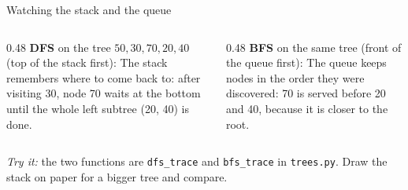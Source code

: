 \documentclass[aspectratio=169,10pt]{beamer}
\begin{document}
\begin{frame}{Watching the stack and the queue}
\begin{columns}[T]
\begin{column}{0.48\textwidth}
{\small \textbf{DFS} on the tree $50,30,70,20,40$ (top of the stack first):}
\vspace{2mm}
{\small The stack remembers where to come back to: after visiting 30, node 70 waits at the bottom until the whole left subtree (20, 40) is done.}
\end{column}
\begin{column}{0.48\textwidth}
{\small \textbf{BFS} on the same tree (front of the queue first):}
\vspace{2mm}
{\small The queue keeps nodes in the order they were discovered: 70 is served before 20 and 40, because it is closer to the root.}
\end{column}
\end{columns}
\vspace{2mm}
{\small \emph{Try it:} the two functions are \texttt{dfs\_trace} and \texttt{bfs\_trace} in \texttt{trees.py}. Draw the stack on paper for a bigger tree and compare.}
\end{frame}
\end{document}
